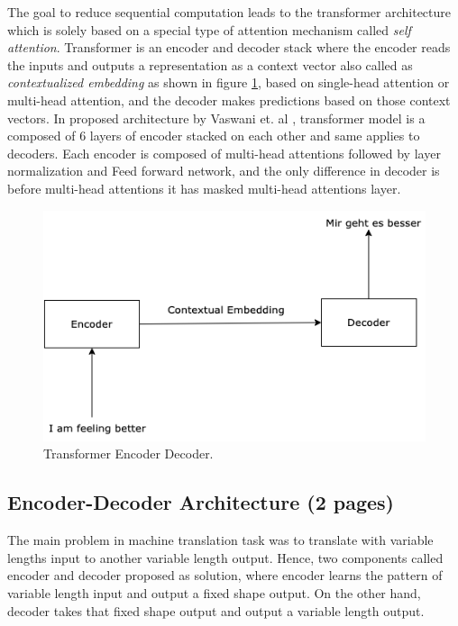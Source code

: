 \documentclass[%
	BCOR=8mm, %
	DIV=12, 
	toc=bibliography, %
	toc=listof, %
	oneside, %
	egregdoesnotlikesansseriftitles, %
	]{scrbook}
\begin{document}
The goal to reduce sequential computation leads to the transformer architecture which is solely based on a special type of attention mechanism called \textit{self attention}. Transformer is an encoder and decoder stack where the encoder reads the inputs and outputs a representation as a context vector also called as \textit{contextualized embedding} as shown in figure \ref{diag:EncoderDecoder}, based 
on single-head attention or multi-head attention, and the decoder makes predictions based on those context vectors. In proposed architecture by Vaswani et. al \cite{vaswani_attention_2017}, 
transformer model is a composed of 6 layers of encoder stacked on each other and same applies to decoders.  Each encoder is composed of multi-head attentions followed by layer normalization 
and Feed forward network, and the only difference in decoder is before multi-head attentions it has masked multi-head attentions layer. 

\begin{figure}[h!]
\centering
\includegraphics[width=.50\textwidth]{img/encoderDecoder.png}
\caption[Encoder Decoder]{Transformer Encoder Decoder.}
\label{diag:EncoderDecoder}
\end{figure}

\subsection{Encoder-Decoder Architecture (2 pages)}

The main problem in machine translation task was to translate with variable lengths input to another variable length output. Hence, two components called encoder and decoder proposed as solution, where encoder learns the pattern of variable length input and output a fixed shape output.  On the other hand, decoder takes that fixed shape output and output a variable length output.  
\end{document}
